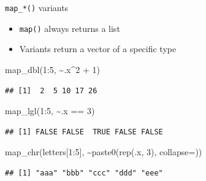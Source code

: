 \documentclass[
  ignorenonframetext,
]{beamer}
\newenvironment{Shaded}{\begin{snugshade}}{\end{snugshade}}
\newcommand{\AttributeTok}[1]{\textcolor[rgb]{0.77,0.63,0.00}{#1}}
\newcommand{\DecValTok}[1]{\textcolor[rgb]{0.00,0.00,0.81}{#1}}
\newcommand{\FunctionTok}[1]{\textcolor[rgb]{0.00,0.00,0.00}{#1}}
\newcommand{\NormalTok}[1]{#1}
\newcommand{\SpecialCharTok}[1]{\textcolor[rgb]{0.00,0.00,0.00}{#1}}
\newcommand{\StringTok}[1]{\textcolor[rgb]{0.31,0.60,0.02}{#1}}
\providecommand{\tightlist}{%
  \setlength{\itemsep}{0pt}\setlength{\parskip}{0pt}}
\begin{document}
\begin{frame}[fragile]{\texttt{map\_*()} variants}
\protect\hypertarget{map_-variants}{}
\begin{itemize}
\tightlist
\item
  \texttt{map()} always returns a list
\item
  Variants return a vector of a specific type
\end{itemize}

\begin{Shaded}
\begin{Highlighting}[]
\FunctionTok{map\_dbl}\NormalTok{(}\DecValTok{1}\SpecialCharTok{:}\DecValTok{5}\NormalTok{, }\SpecialCharTok{\textasciitilde{}}\NormalTok{.x}\SpecialCharTok{\^{}}\DecValTok{2} \SpecialCharTok{+} \DecValTok{1}\NormalTok{)}
\end{Highlighting}
\end{Shaded}

\begin{verbatim}
## [1]  2  5 10 17 26
\end{verbatim}

\begin{Shaded}
\begin{Highlighting}[]
\FunctionTok{map\_lgl}\NormalTok{(}\DecValTok{1}\SpecialCharTok{:}\DecValTok{5}\NormalTok{, }\SpecialCharTok{\textasciitilde{}}\NormalTok{.x }\SpecialCharTok{==} \DecValTok{3}\NormalTok{)}
\end{Highlighting}
\end{Shaded}

\begin{verbatim}
## [1] FALSE FALSE  TRUE FALSE FALSE
\end{verbatim}

\begin{Shaded}
\begin{Highlighting}[]
\FunctionTok{map\_chr}\NormalTok{(letters[}\DecValTok{1}\SpecialCharTok{:}\DecValTok{5}\NormalTok{], }\SpecialCharTok{\textasciitilde{}}\FunctionTok{paste0}\NormalTok{(}\FunctionTok{rep}\NormalTok{(.x, }\DecValTok{3}\NormalTok{), }\AttributeTok{collapse=}\StringTok{\textquotesingle{}\textquotesingle{}}\NormalTok{))}
\end{Highlighting}
\end{Shaded}

\begin{verbatim}
## [1] "aaa" "bbb" "ccc" "ddd" "eee"
\end{verbatim}
\end{frame}
\end{document}
